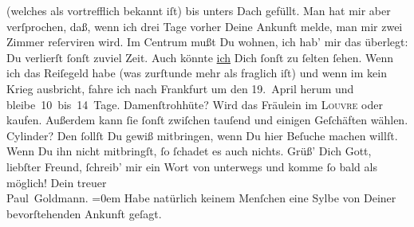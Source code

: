 \begin{ledgroupsized}[t]{13cm}
               (welches als vortrefflich bekannt iſt) bis unters Dach gefüllt. Man hat mir aber
               verſprochen, daß, wenn ich drei Tage vorher Deine Ankunft melde, man mir zwei Zimmer
               reſerviren wird. Im Centrum
               mußt Du wohnen, ich hab’ mir das überlegt: Du verlierſt ſonſt zuviel Zeit. Auch
               könnte \uline{ich} Dich ſonſt zu ſelten ſehen.\pend
           \pstart
           {\pb}Wenn ich das Reiſegeld habe (was zurſtunde mehr als
               fraglich iſt) und wenn im \label{K_L02807-23v}\label{K_L02807-23h} kein Krieg ausbricht, fahre ich nach Frankfurt um den 19. April herum und
               bleibe 10 bis 14 Tage.\pend
           \pstart
           Damenſtrohhüte? Wird  das Fräulein im \textsc{Louvre} oder \label{K_L02807-45v}\label{K_L02807-45h} kaufen.  Außerdem kann ſie ſonſt zwiſchen tauſend und einigen Geſchäften
               wählen.\pend
           \pstart
           Cylinder? Den ſollſt Du gewiß mitbringen, wenn Du hier Beſuche machen willſt. Wenn
                  {\pb}Du ihn nicht mitbringſt, ſo ſchadet es auch
               nichts.\pend
           \pstart
           Grüß’ Dich Gott, liebſter Freund, ſchreib’ mir ein Wort \strikeout{\textcolor{gray}{×}} von unterwegs und komme ſo bald als möglich!\pend
           \pstart
           Dein treuer {\\[\baselineskip]}\spacefill\mbox{Paul Goldmann.}\pend
           \leftskip=0em{}\pstart
           \noindent{}Habe natürlich keinem Menſchen eine Sylbe von Deiner bevorſtehenden Ankunft
                  geſagt.\pend
           
         
         \endnumbering{}\end{ledgroupsized}  \newcommand{\dateiname}{L02807}\newcommand{\titel}{Paul Goldmann an Arthur Schnitzler, 4. 4. [1897]}\newcommand{\editorInnen}{Martin Anton Müller und Laura Untner}
      